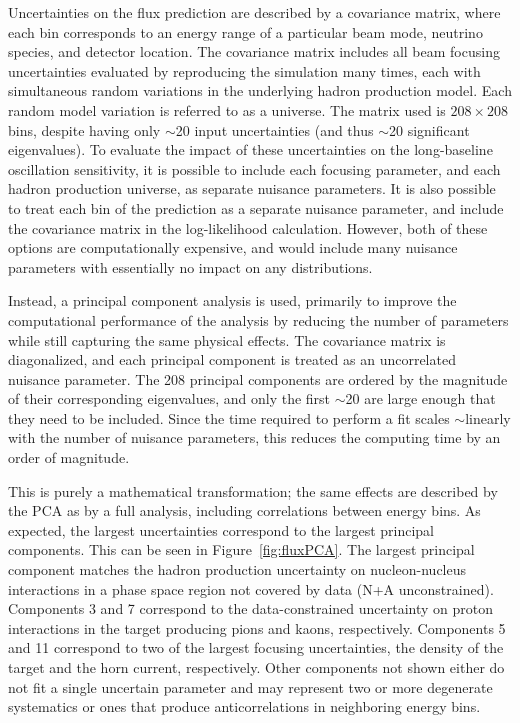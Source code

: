 Uncertainties on the flux prediction are described by a covariance matrix, where each bin corresponds to an energy range of a particular beam mode, neutrino species, and detector location. The covariance matrix includes all beam focusing uncertainties evaluated by reproducing the simulation many times, each with simultaneous random variations in the underlying hadron production model. Each random model variation is referred to as a universe. The  matrix used is $208 \times 208$ bins, despite having only $\sim$20 input uncertainties (and thus $\sim$20 significant eigenvalues). To evaluate the impact of these uncertainties on the long-baseline oscillation sensitivity, it is possible to include each focusing parameter, and each hadron production universe, as separate nuisance parameters. It is also possible to treat each bin of the prediction as a separate nuisance parameter, and include the covariance matrix in the log-likelihood calculation. However, both of these options are computationally expensive, and would include many nuisance parameters with essentially no impact on any distributions.

Instead, a principal component analysis is used, primarily to improve the computational performance of the analysis by reducing the number of parameters while still capturing the same physical effects. The covariance matrix is diagonalized, and each principal component is treated as an uncorrelated nuisance parameter. The 208 principal components are ordered by the magnitude of their corresponding eigenvalues, and only the first $\sim$20 are large enough that they need to be included. Since the time required to perform a fit scales $\sim$linearly with the number of nuisance parameters, this reduces the computing time by an order of magnitude.

This is purely a mathematical transformation; the same effects are described by the PCA as by a full analysis, including correlations between energy bins. As expected, the largest uncertainties correspond to the largest principal components. This can be seen in Figure~\ref{fig:fluxPCA}. The largest principal component matches the hadron production uncertainty on nucleon-nucleus interactions in a phase space region not covered by data (N+A unconstrained). Components 3 and 7 correspond to the data-constrained uncertainty on proton interactions in the target producing pions and kaons, respectively. Components 5 and 11 correspond to two of the largest focusing uncertainties, the density of the target and the horn current, respectively. Other components not shown either do not fit a single uncertain parameter and may represent two or more degenerate systematics or ones that produce anticorrelations in neighboring energy bins.

